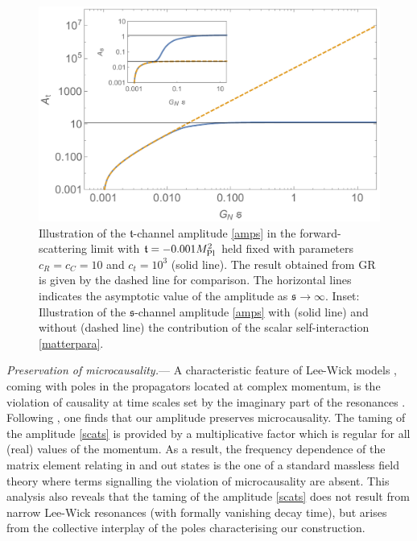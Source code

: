 \documentclass[aps,prl,onecolumn,superscriptaddress,longbibliography,nofootinbib,floatfix,showpacs,12pt]{revtex4-1}
\newcommand{\GR}{{\small GR}}
\newcommand{\mans}{\ensuremath{\mathfrak{s}}}
\newcommand{\mant}{\ensuremath{\mathfrak{t}}}
\begin{document}
%
\begin{figure}
	\includegraphics[width=5in]{asa2}
	\caption{Illustration of the $\mant$-channel amplitude \eqref{amps} in the forward-scattering limit with $\mant = -0.001 M_{\rm Pl}^2$ held fixed with parameters $c_R = c_C = 10$  and $c_t = 10^3$  (solid line). The result obtained from \GR{} is given by the dashed line for comparison. The horizontal lines indicates the asymptotic value of the amplitude as $\mans \rightarrow \infty$. Inset: Illustration of the $\mans$-channel amplitude \eqref{amps} with (solid line) and without (dashed line) the contribution of the scalar self-interaction \eqref{matterpara}.}
	\label{fig:forwardamplitude}
\end{figure}
%

\textit{Preservation of microcausality.}---
A characteristic feature of Lee-Wick models \cite{Lee:1969fy, Lee:1970iw}, coming with poles in the propagators located at complex momentum, is the violation of causality at time scales set by the imaginary part of the resonances \cite{Grinstein:2008bg, Anselmi:2018tmf, Donoghue:2019ecz}.
Following \cite{Grinstein:2008bg}, one finds that our amplitude preserves microcausality.
The taming of the amplitude \eqref{scats} is provided by a multiplicative factor which is regular for all (real) values of the momentum. As a result, the  frequency dependence of the matrix element relating in and out states is the one of a standard massless field theory where terms signalling the violation of microcausality are absent.
This analysis also reveals that the taming of the amplitude \eqref{scats} does not result from narrow Lee-Wick resonances (with formally vanishing decay time), but arises from the collective interplay of the poles characterising our construction.
\end{document}
